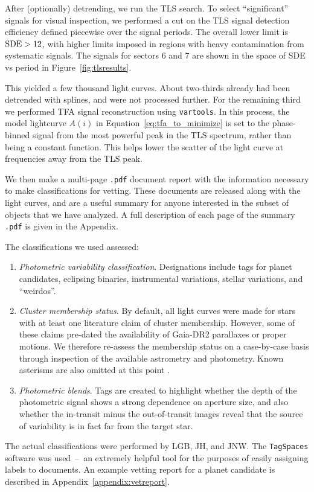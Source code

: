 \documentclass[12pt,twocolumn,tighten]{aastex62}
\begin{document}
After (optionally) detrending, we run the TLS search. To select 
``significant'' signals for visual inspection, we 
performed a cut on the TLS signal detection efficiency defined piecewise over 
the signal periods.
The overall lower limit is ${\rm SDE} > 12$, with higher limits imposed in 
regions with heavy contamination from systematic signals.
The signals for sectors 6 and 7 are shown in the space of SDE vs period in 
Figure~\ref{fig:tlsresults}.

This yielded a few thousand light curves.  About two-thirds already had been 
detrended with splines, and were not processed further.
For the remaining third we
performed TFA signal reconstruction using 
\texttt{vartools}.
In this process, the model lightcurve $A(i)$ in 
Equation~\ref{eq:tfa_to_minimize} is set to the phase-binned signal from the 
most powerful peak in the TLS spectrum, rather than being a constant function. 
This helps lower the scatter of the light curve at frequencies away from
the TLS peak.

We then make a multi-page \texttt{.pdf} document report with the information 
necessary to make classifications for vetting.
These documents are released along with the light curves, and are a useful 
summary for anyone interested in the subset of objects that we have analyzed.
A full description of each page of the summary \texttt{.pdf} is given in the 
Appendix.

The classifications we used assessed:
\begin{enumerate}
    \item {\it Photometric variability classification}. Designations include 
    tags for planet candidates, eclipsing binaries, instrumental variations, 
    stellar variations, and ``weirdos''.
    \item {\it Cluster membership status}. By default, all light curves were 
    made for stars with at least one literature claim of cluster membership.  
    However, some of these claims pre-dated the availability of Gaia-DR2
    parallaxes or proper motions.
    We therefore re-assess the membership status on a case-by-case basis 
    through inspection of the available astrometry and photometry.
    Known asterisms are also omitted at this point
    \citep[{\it e.g.},][]{sulentic_revised_1973,baumgardt_asterisms_1998,kos_galah_2018}.
    \item {\it Photometric blends}. Tags are created to highlight whether the 
    depth of the photometric signal shows a strong dependence on aperture 
    size, and also whether the in-transit minus the out-of-transit images 
    reveal that the source of variability is in fact far from the target star.
\end{enumerate}
The actual classifications were performed by LGB, JH, and JNW.
The \texttt{TagSpaces} software was used~--~an extremely helpful tool
for the purposes of easily assigning labels to documents.
An example vetting report for a planet candidate is described in
Appendix~\ref{appendix:vetreport}.
\end{document}

